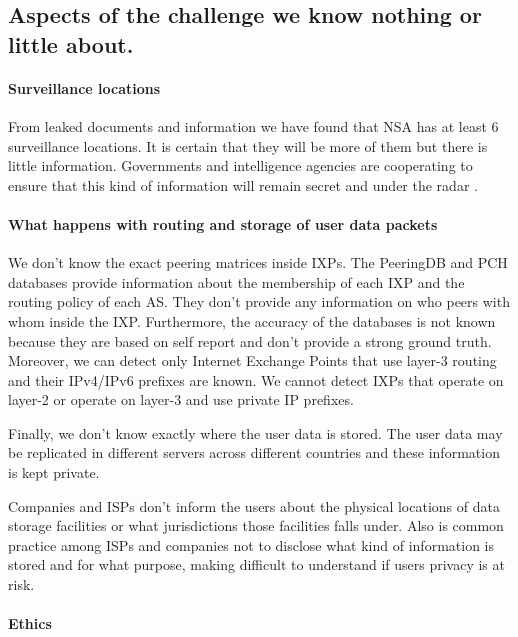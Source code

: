\subsection{Aspects of the challenge we know nothing or little about.} 

\paragraph{Surveillance locations}

From leaked documents and information we have found that NSA has at least 6 
surveillance locations. It is certain that they will be more of them but there 
is little information. Governments and intelligence agencies are cooperating to 
ensure that this kind of information will remain secret and under the radar 
\cite{obar2012internet}.

\paragraph{What happens with routing and storage of user data packets}

We don't know the exact peering matrices inside IXPs. The PeeringDB and PCH 
databases provide information about the membership of each IXP and the routing 
policy of each AS. They don't provide any information on who peers with whom 
inside the IXP. Furthermore, the accuracy of the databases is not known because 
they are based on self report and don't provide a strong ground truth. Moreover, 
we can detect only Internet Exchange Points that use layer-3 routing and their 
IPv4/IPv6 prefixes are known. We cannot detect IXPs that operate on layer-2 or 
operate on layer-3 and use private IP prefixes. 

Finally, we don't know exactly where the user data is stored. The user data may 
be replicated in different servers across different countries and these 
information is kept private.

Companies and ISPs don't inform the users about the physical locations of data 
storage facilities or what jurisdictions those facilities falls under. Also is 
common practice among ISPs and companies not to disclose what kind of 
information is stored and for what purpose, making difficult to understand if 
users privacy is at risk.

\paragraph{Ethics}

